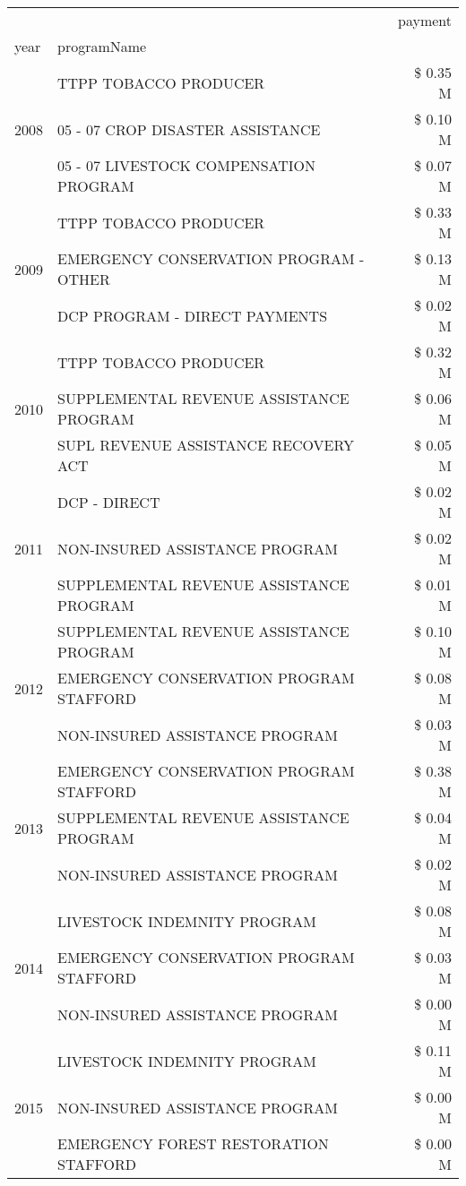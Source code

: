 \begin{tabular}{llr}
\toprule
 &  & payment \\
year & programName &  \\
\midrule
\multirow[t]{3}{*}{2008} & TTPP TOBACCO PRODUCER & \$ 0.35 M \\
 & 05 - 07 CROP DISASTER ASSISTANCE & \$ 0.10 M \\
 & 05 - 07 LIVESTOCK COMPENSATION PROGRAM & \$ 0.07 M \\
\cline{1-3}
\multirow[t]{3}{*}{2009} & TTPP TOBACCO PRODUCER & \$ 0.33 M \\
 & EMERGENCY CONSERVATION PROGRAM - OTHER & \$ 0.13 M \\
 & DCP PROGRAM - DIRECT PAYMENTS & \$ 0.02 M \\
\cline{1-3}
\multirow[t]{3}{*}{2010} & TTPP TOBACCO PRODUCER & \$ 0.32 M \\
 & SUPPLEMENTAL REVENUE ASSISTANCE PROGRAM & \$ 0.06 M \\
 & SUPL REVENUE ASSISTANCE RECOVERY ACT & \$ 0.05 M \\
\cline{1-3}
\multirow[t]{3}{*}{2011} & DCP - DIRECT & \$ 0.02 M \\
 & NON-INSURED ASSISTANCE PROGRAM & \$ 0.02 M \\
 & SUPPLEMENTAL REVENUE ASSISTANCE PROGRAM & \$ 0.01 M \\
\cline{1-3}
\multirow[t]{3}{*}{2012} & SUPPLEMENTAL REVENUE ASSISTANCE PROGRAM & \$ 0.10 M \\
 & EMERGENCY CONSERVATION PROGRAM STAFFORD & \$ 0.08 M \\
 & NON-INSURED ASSISTANCE PROGRAM & \$ 0.03 M \\
\cline{1-3}
\multirow[t]{3}{*}{2013} & EMERGENCY CONSERVATION PROGRAM STAFFORD & \$ 0.38 M \\
 & SUPPLEMENTAL REVENUE ASSISTANCE PROGRAM & \$ 0.04 M \\
 & NON-INSURED ASSISTANCE PROGRAM & \$ 0.02 M \\
\cline{1-3}
\multirow[t]{3}{*}{2014} & LIVESTOCK INDEMNITY PROGRAM & \$ 0.08 M \\
 & EMERGENCY CONSERVATION PROGRAM STAFFORD & \$ 0.03 M \\
 & NON-INSURED ASSISTANCE PROGRAM & \$ 0.00 M \\
\cline{1-3}
\multirow[t]{3}{*}{2015} & LIVESTOCK INDEMNITY PROGRAM & \$ 0.11 M \\
 & NON-INSURED ASSISTANCE PROGRAM & \$ 0.00 M \\
 & EMERGENCY FOREST RESTORATION STAFFORD & \$ 0.00 M \\

\end{tabular}
